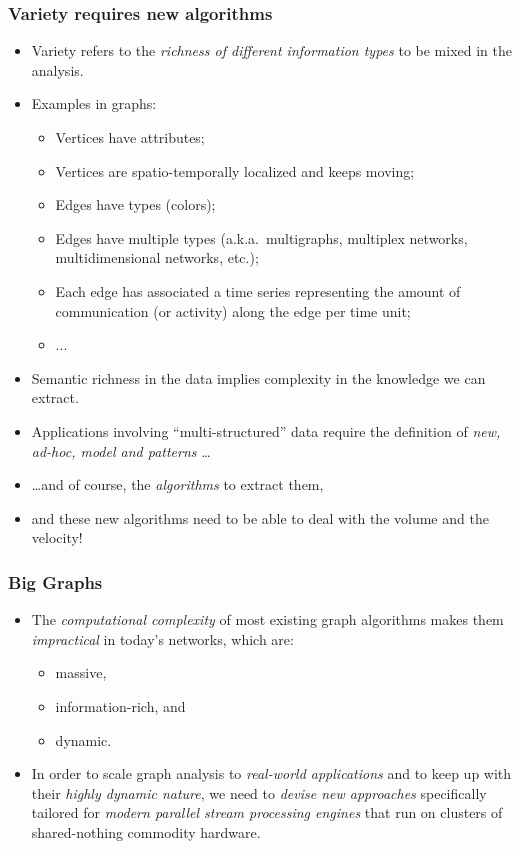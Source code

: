 \begin{frame}
  \frametitle{Variety requires new algorithms}
  \pause
  \begin{itemize}
    \item Variety refers to the \emph{richness of different information types}
      to be mixed in the analysis.
    \vfill
    \pause
    \item Examples in graphs:
      \begin{itemize}
        \pause
        \item Vertices have attributes;
        \pause
        \item Vertices are spatio-temporally localized and keeps moving;
        \pause
        \item Edges have types (colors);
        \pause
        \item Edges have multiple types (a.k.a.~multigraphs, multiplex networks,
          multidimensional networks, etc.);
        \pause
        \item Each edge has associated a time series representing the amount of
          communication (or activity) along the edge per time unit;
        \pause \item ...
      \end{itemize}
    \vfill
    \pause
    \item Semantic richness in the data implies complexity in the knowledge we can
      extract.
    \pause
    \item Applications involving ``multi-structured'' data require the definition
      of \emph{new, ad-hoc, model and patterns} \ldots
    \pause
    \item \ldots and of course, the \emph{algorithms} to extract them,
    \pause
    \item and these new algorithms need to be able to deal with the volume and the
      velocity!
  \end{itemize}
\end{frame}

\begin{frame}
  \frametitle{Big Graphs}
  \begin{itemize}
    \item The \emph{computational complexity} of most existing graph algorithms
      makes them \emph{impractical} in today's networks, which are:
      \begin{itemize}
        \item massive,
        \item information-rich, and
        \item dynamic.
      \end{itemize}
    \item In order to scale graph analysis to \emph{real-world applications} and
      to keep up with their \emph{highly dynamic nature}, we need to
      \emph{devise new approaches} specifically tailored for \emph{modern
        parallel stream processing engines} that run on clusters of
        shared-nothing commodity hardware.
  \end{itemize}
\end{frame}

